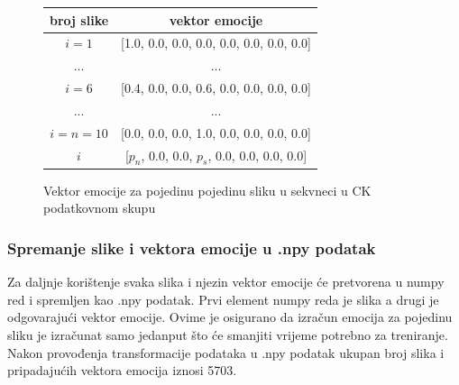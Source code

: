 \documentclass[times, utf8, zavrsni,numeric,pstricks]{fer}
\begin{document}
\begin{figure}[H]
\centering
\begin{tabular}{|c|c|} 
\hline
broj slike & vektor emocije \\
\hline
$i = 1$ & [1.0, 0.0, 0.0, 0.0, 0.0, 0.0, 0.0, 0.0] \\
... & ... \\
$i = 6$ & [0.4, 0.0, 0.0, 0.6, 0.0, 0.0, 0.0, 0.0] \\
... & ... \\
$i = n = 10$ & [0.0, 0.0, 0.0, 1.0, 0.0, 0.0, 0.0, 0.0] \\
$i$ & [$p_n$, 0.0, 0.0, $p_s$, 0.0, 0.0, 0.0, 0.0]  \\
\hline
\end{tabular}
\caption{Vektor emocije za pojedinu pojedinu sliku u sekvneci u CK podatkovnom skupu}
\label{pic:ck_emotion_rise}
\end{figure}



\subsubsection{Spremanje slike i vektora emocije u .npy podatak}\label{self:npy_save}
Za daljnje korištenje svaka slika i njezin vektor emocije će pretvorena u numpy red \cite{numpy_array} i spremljen kao .npy podatak. Prvi element numpy reda je slika a drugi je odgovarajući vektor emocije. Ovime je osigurano da izračun emocija za pojedinu sliku je izračunat samo jedanput što će smanjiti vrijeme potrebno za treniranje. Nakon provođenja transformacije podataka u .npy podatak ukupan broj slika i pripadajućih vektora emocija iznosi 5703. 
\end{document}
